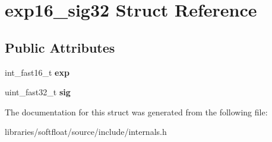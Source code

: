 \hypertarget{structexp16__sig32}{}\section{exp16\+\_\+sig32 Struct Reference}
\label{structexp16__sig32}
\subsection*{Public Attributes}
\begin{DoxyCompactItemize}
\item 
\mbox{\label{structexp16__sig32_a5e0ff7c93dd063580d1423f72a4f7619}} 
int\+\_\+fast16\+\_\+t {\bfseries exp}
\item 
\mbox{\label{structexp16__sig32_a5b77014194529807d996c9d85bb94534}} 
uint\+\_\+fast32\+\_\+t {\bfseries sig}
\end{DoxyCompactItemize}


The documentation for this struct was generated from the following file\+:\begin{DoxyCompactItemize}
\item 
libraries/softfloat/source/include/internals.\+h\end{DoxyCompactItemize}
